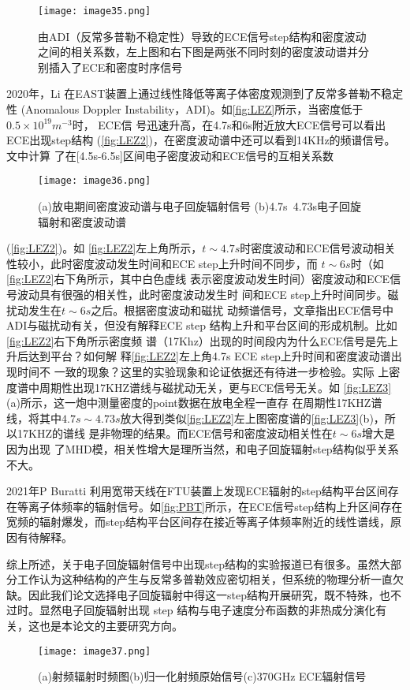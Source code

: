 \begin{figure}[ht]
\centering
\texttt{[image: image35.png]}
\caption{\label{fig:LEZ2}由ADI（反常多普勒不稳定性）导致的ECE信号step结构和密度波动之间的相关系数，左上图和右下图是两张不同时刻的密度波动谱并分别插入了ECE和密度时序信号\cite{RN1859}	}
\end{figure}
 \par 2020年，Li\cite{RN1859}	在EAST装置上通过线性降低等离子体密度观测到了反常多普勒不稳定性 (Anomalous Doppler Instability，ADI)。如\autoref{fig:LEZ}所示，当密度低于$0.5\times10^{19}m^{-3}$时， ECE信
号迅速升高，在4.7s和6s附近放大ECE信号可以看出ECE出现step结构
(\autoref{fig:LEZ2})，在密度波动谱中还可以看到14KHz的频谱信号。文中计算
了在[4.5s-6.5s]区间电子密度波动和ECE信号的互相关系数
\begin{figure}[ht]
\centering
\texttt{[image: image36.png]}
\caption{\label{fig:LEZ3}(a)放电期间密度波动谱与电子回旋辐射信号
(b)4.7s~4.73s电子回旋辐射和密度波动谱}
\end{figure}
(\autoref{fig:LEZ2})。如
\autoref{fig:LEZ2}左上角所示，$t\sim4.7s$时密度波动和ECE信号波动相关性较小，此时密度波动发生时间和ECE step上升时间不同步，而
$t\sim6s$时（如\autoref{fig:LEZ2}右下角所示，其中白色虚线
表示密度波动发生时间）密度波动和ECE信号波动具有很强的相关性，此时密度波动发生时
间和ECE step上升时间同步。磁扰动发生在$t\sim6s$之后。根据密度波动和磁扰
动频谱信号，文章指出ECE信号中ADI与磁扰动有关，但没有解释ECE step
结构上升和平台区间的形成机制。比如\autoref{fig:LEZ2}右下角所示密度频
谱（17Khz）出现的时间段内为什么ECE信号是先上升后达到平台？如何解
释\autoref{fig:LEZ2}左上角4.7s ECE step上升时间和密度波动谱出现时间不
一致的现象？这里的实验现象和论证依据还有待进一步检验。实际
上密度谱中周期性出现17KHZ谱线与磁扰动无关，更与ECE信号无关。如
\autoref{fig:LEZ3}(a)所示，这一炮中测量密度的point数据在放电全程一直存
在周期性17KHZ谱线，将其中$4.7s\sim4.73s$放大得到类似\autoref{fig:LEZ2}左上图密度谱的\autoref{fig:LEZ3}(b)，所以17KHZ的谱线
是非物理的结果。而ECE信号和密度波动相关性在$t\sim6s$增大是因为出现
了MHD模，相关性增大是理所当然，和电子回旋辐射step结构似乎关系不大。




\par 2021年P Buratti 利用宽带天线在FTU装置上发现ECE辐射的step结构平台区间存在等离子体频率的辐射信号\cite{RN798}。如\autoref{fig:PBT}所示，在ECE信号step结构上升区间存在宽频的辐射爆发，而step结构平台区间存在接近等离子体频率附近的线性谱线，原因有待解释。
\par 综上所述，关于电子回旋辐射信号中出现step结构的实验报道已有很多。虽然大部分工作认为这种结构的产生与反常多普勒效应密切相关，但系统的物理分析一直欠缺。因此我们论文选择电子回旋辐射中得这一step结构开展研究，既不特殊，也不过时。显然电子回旋辐射出现 step 结构与电子速度分布函数的非热成分演化有关，这也是本论文的主要研究方向。
\begin{figure}[ht]
\centering
\texttt{[image: image37.png]}
\caption{\label{fig:PBT}(a)射频辐射时频图(b)归一化射频原始信号(c)370GHz ECE辐射信号\cite{RN798}}
\end{figure}
